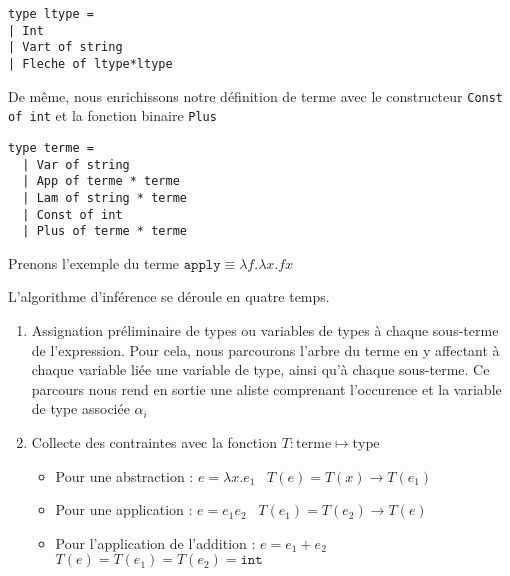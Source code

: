 \begin{Verbatim}
type ltype = 
| Int 
| Vart of string
| Fleche of ltype*ltype
\end{Verbatim}

De même, nous enrichissons notre définition de terme avec le constructeur \verb+Const of int+ et la fonction binaire  \verb+Plus+ 
\begin{Verbatim}
type terme = 
  | Var of string 
  | App of terme * terme 
  | Lam of string * terme
  | Const of int
  | Plus of terme * terme
\end{Verbatim}

Prenons l'exemple du terme 
$\mathtt{apply} \equiv \lambda f . \lambda x .fx$

L'algorithme d'inférence se déroule en quatre temps.

\begin{enumerate}
  \item Assignation préliminaire de types ou variables de types à chaque sous-terme de l'expression.
  Pour cela, nous parcourons  l'arbre du terme en y affectant à chaque variable liée une variable de type, ainsi qu'à
  chaque sous-terme. Ce parcours nous rend en sortie une aliste comprenant l'occurence et la variable de type associée $\alpha_i$
 \begin{center} 
\end{center}

  \item Collecte des contraintes avec la fonction $T: \mathrm{terme} \mapsto \mathrm{type}$ 
    \begin{itemize}
      \item Pour une abstraction :  $e = \lambda x.e_1 $ \imp\ $T(e) = T(x) \rightarrow T(e_1) $
      \item Pour une application :  $e = e_1 e_2$ \imp\ $T(e_1) = T(e_2) \rightarrow T(e) $
      \item Pour l'application de l'addition  : $e=e_1+e_2$ \imp\ $T(e)= T(e_1) = T(e_2) = \mathtt{int} $
    \end{itemize}  


\end{enumerate}

